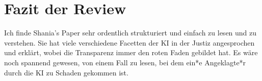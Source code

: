 \documentclass{article}
\begin{document}
\section{Fazit der Review}
    Ich finde Shania's Paper sehr ordentlich strukturiert und einfach zu lesen und zu verstehen. Sie hat viele verschiedene Facetten der KI in der Justiz angesprochen und erklärt, wobei die Transparenz immer den roten Faden gebildet hat.
    \newline Es wäre noch spannend gewesen, von einem Fall zu lesen, bei dem ein*e Angeklagte*r durch die KI zu Schaden gekommen ist.

\printbibliography
\end{document}
